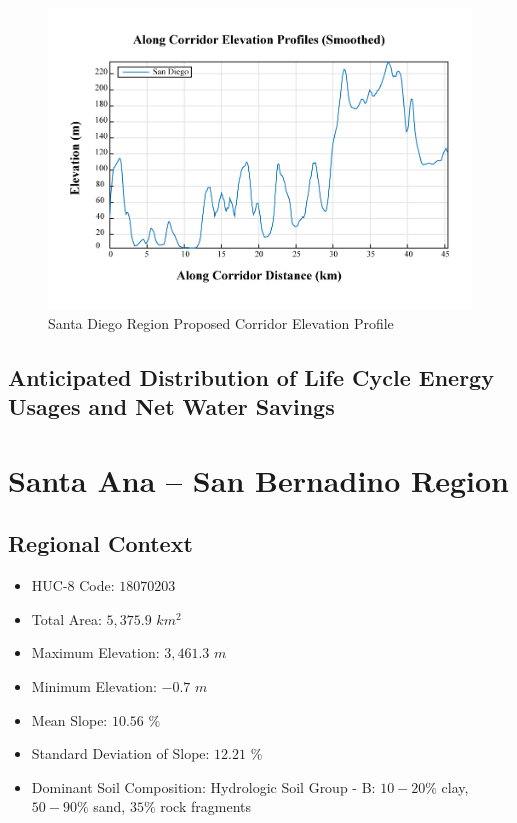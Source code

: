         \begin{figure}[!h]
            \begin{center}
            \includegraphics[width=5.5in]{figures/SanDiego_Elevation_Profile.png}   
            \caption{Santa Diego Region Proposed Corridor Elevation Profile}
            \label{fig:SDelevationProfile}
            \end{center}
        \end{figure}
    
    \subsection{Anticipated Distribution of Life Cycle Energy Usages and Net Water Savings}

\clearpage

\section{Santa Ana -- San Bernadino Region}

    \subsection{Regional Context}

    \begin{itemize}
      \setlength{\itemsep}{0cm}
      \setlength{\parskip}{0cm}
        \item HUC-8 Code: $18070203$
        \item Total Area: $5,375.9$ $km^2$
        \item Maximum Elevation: $3,461.3$ $m$
        \item Minimum Elevation: $-0.7$ $m$
        \item Mean Slope: $10.56$ $\%$
        \item Standard Deviation of Slope: $12.21$ $\%$
        \item Dominant Soil Composition: Hydrologic Soil Group - B: $10-20\%$ clay, $50-90\%$ sand, $35\%$ rock fragments
    \end{itemize}
    
